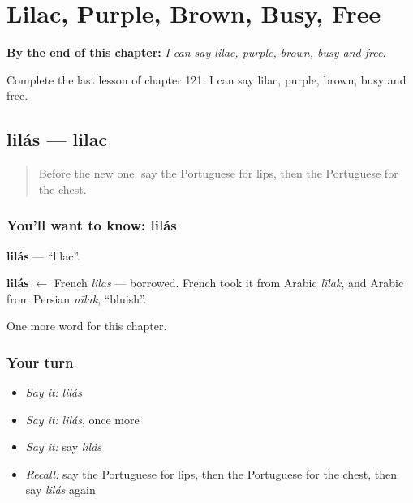 
\chapter{Lilac, Purple, Brown, Busy, Free}
\label{ch:pt-lilac-purple-brown-busy-free}

\begin{chapteropening}
\textbf{By the end of this chapter:} \emph{I can say lilac, purple, brown, busy and free.}

Complete the last lesson of chapter 121: I can say lilac, purple, brown, busy and free.
\end{chapteropening}

\section[lilás]{lilás — lilac}

\label{lesson:PT-C121-lilas}



\begin{quote}
Before the new one: say the Portuguese for lips, then the Portuguese for the chest.
\end{quote}

\subsection*{You'll want to know: lilás}
\textbf{lilás} — \textquotedblleft{}lilac\textquotedblright{}.

\begin{cousinweb}
\textbf{lilás} $\leftarrow$ French \emph{lilas} — borrowed. French took it from Arabic \emph{līlak}, and Arabic from Persian \emph{nīlak}, \textquotedblleft{}bluish\textquotedblright{}.
\end{cousinweb}

\begin{grammarlens}[title={What you've built}]
One more word for this chapter.
\end{grammarlens}

\subsection*{Your turn}
\begin{itemize}
\raggedright
  \item \emph{Say it:} \emph{lilás}
  \item \emph{Say it:} \emph{lilás}, once more
  \item \emph{Say it:} say \emph{lilás}
  \item \emph{Recall:} say the Portuguese for lips, then the Portuguese for the chest, then say \emph{lilás} again
\end{itemize}

